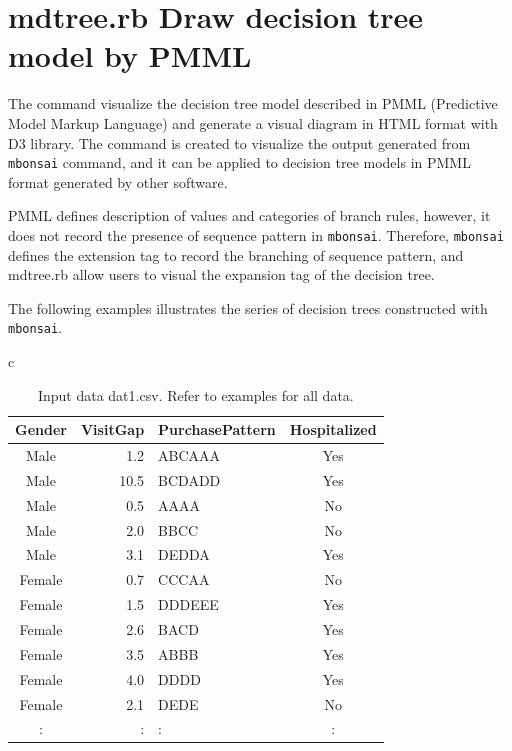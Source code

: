 



\section{mdtree.rb Draw decision tree model by PMML \label{sect:mdtree}}

The command visualize the decision tree model described in PMML  (Predictive Model Markup Language) and generate a visual diagram in HTML format with D3 library. 
The command is created to visualize the output generated from  \verb|mbonsai| command, and it can be applied to decision tree models in PMML format generated by other software. 

PMML defines description of  values and categories of branch rules, however, it does not record the presence of sequence pattern in  \verb|mbonsai|. 
Therefore, \verb|mbonsai| defines the extension tag to record the branching of sequence pattern, and mdtree.rb allow users to visual the expansion tag of the decision tree.  
  
 The following examples illustrates the series of decision trees constructed with  \verb|mbonsai|. 


\begin{table}[htbp]
\begin{center}
\begin{tabular}{c}

\begin{minipage}{0.5\hsize}
\begin{center}
\caption{Input data dat1.csv. Refer to examples for all data.  \label{tbl:mdtree_input1}}
{\small
\begin{tabular}{crlc}
\hline
Gender&VisitGap&PurchasePattern&Hospitalized \\
\hline
Male&1.2&ABCAAA&Yes\\
Male&10.5&BCDADD&Yes\\
Male&0.5&AAAA&No\\
Male&2.0&BBCC&No\\
Male&3.1&DEDDA&Yes\\
Female&0.7&CCCAA&No\\
Female&1.5&DDDEEE&Yes\\
Female&2.6&BACD&Yes\\
Female&3.5&ABBB&Yes\\
Female&4.0&DDDD&Yes\\
Female&2.1&DEDE&No\\
:&:&:&:\\
\hline
\end{tabular} 
}
\end{center}
\end{minipage}

\end{tabular} 
\end{center}
\end{table} 


